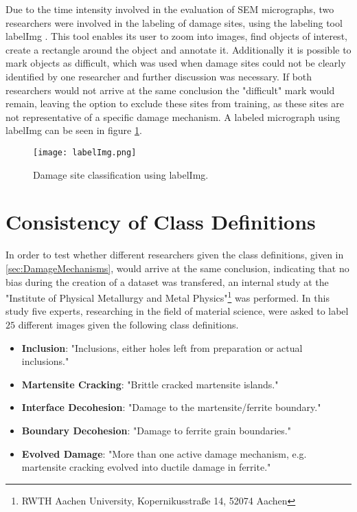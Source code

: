 Due to the time intensity involved in the evaluation of SEM micrographs, two researchers were involved in the labeling of damage sites, using the labeling tool labelImg \cite{labelImg}. This tool enables its user to zoom into images, find objects of interest, create a rectangle around the object and annotate it. Additionally it is possible to mark objects as difficult, which was used when damage sites could not be clearly identified by one researcher and further discussion was necessary. If both researchers would not arrive at the same conclusion the "difficult" mark would remain, leaving the option to exclude these sites from training, as these sites are not representative of a specific damage mechanism. A labeled micrograph using labelImg can be seen in figure \ref{fig:labelImg}. 

\begin{figure}[H]
\centering
\texttt{[image: labelImg.png]}
\caption{Damage site classification using labelImg.}
\label{fig:labelImg}
\end{figure}


\section{Consistency of Class Definitions}

In order to test whether different researchers given the class definitions, given in \ref{sec:DamageMechanisms}, would arrive at the same conclusion, indicating that no bias during the creation of a dataset was transfered, an internal study at the "Institute of Physical Metallurgy and Metal Physics"\footnote{RWTH Aachen University, Kopernikusstraße 14, 52074 Aachen} was performed. In this study five experts, researching in the field of material science, were asked to label $25$ different images given the following class definitions.\\

\begin{itemize}[label={}]
\item \textbf{Inclusion}: "Inclusions, either holes left from preparation or actual inclusions."
\item \textbf{Martensite Cracking}: "Brittle cracked martensite islands."
\item \textbf{Interface Decohesion}: "Damage to the martensite/ferrite boundary."
\item \textbf{Boundary Decohesion}: "Damage to ferrite grain boundaries."
\item \textbf{Evolved Damage}: "More than one active damage mechanism, e.g. martensite cracking evolved into ductile damage in ferrite."
\end{itemize}

